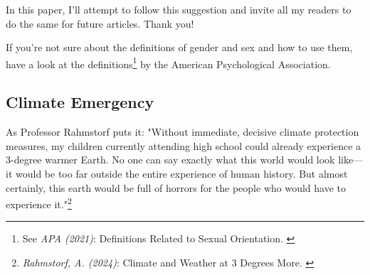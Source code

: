 In this paper, I'll attempt to follow this suggestion and invite all my readers to do the same for future articles. Thank you!

If you're not sure about the definitions of gender and sex and how to use them, have a look at the definitions\footnote{See \textit{APA (2021)}: Definitions Related to Sexual Orientation. \cite{apaDefinitions}} by the American Psychological Association.

\subsection{Climate Emergency}

As Professor Rahmstorf puts it: "Without immediate, decisive climate protection measures, my children currently attending high school could already experience a 3-degree warmer Earth. No one can say exactly what this world would look like—it would be too far outside the entire experience of human history. But almost certainly, this earth would be full of horrors for the people who would have to experience it."\footnote{\textit{Rahmstorf, A. (2024)}: Climate and Weather at 3 Degrees More. \cite{3dgreesMore}}
